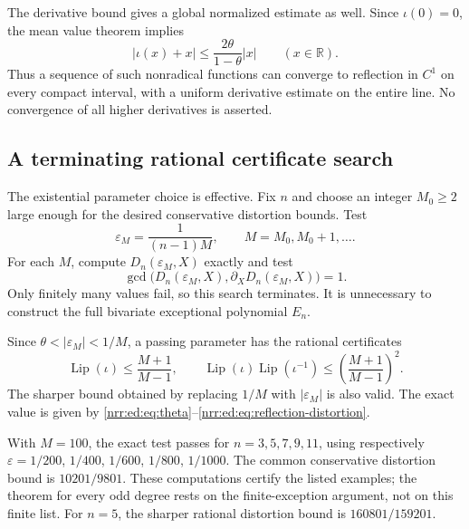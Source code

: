 \documentclass[11pt,letterpaper]{article}
\theoremstyle{definition}
\theoremstyle{remark}
\newcommand{\R}{\mathbb R}
\newcommand{\Lip}{\operatorname{Lip}}
\newcommand{\eps}{\varepsilon}
\begin{document}
The derivative bound gives a global normalized estimate as well. Since
$\iota(0)=0$, the mean value theorem implies
\begin{equation}
 |\iota(x)+x|\le
 \frac{2\theta}{1-\theta}|x|\qquad(x\in\R).
 \label{nrr:ed:eq:global-near-reflection}
\end{equation}
Thus a sequence of such nonradical functions can converge to reflection in
$C^1$ on every compact interval, with a uniform derivative estimate on the entire
line. No convergence of all higher derivatives is asserted.

\subsection{A terminating rational certificate search}

The existential parameter choice is effective. Fix $n$ and choose an integer
$M_0\ge2$ large enough for the desired conservative distortion bounds. Test
\begin{equation}
 \eps_M=\frac{1}{(n-1)M},\qquad M=M_0,M_0+1,\ldots.
 \label{nrr:ed:eq:epsilon-search}
\end{equation}
For each $M$, compute
$D_n(\eps_M,X)$ exactly and test
\begin{equation}
 \gcd\bigl(D_n(\eps_M,X),\partial_XD_n(\eps_M,X)\bigr)=1.
 \label{nrr:ed:eq:disc-gcd}
\end{equation}
Only finitely many values fail, so this search terminates. It is unnecessary to
construct the full bivariate exceptional polynomial $E_n$.

Since $\theta<|\eps_M|<1/M$, a passing parameter has the rational certificates
\begin{equation}
 \Lip(\iota)\le\frac{M+1}{M-1},\qquad
 \Lip(\iota)\Lip(\iota^{-1})\le\left(\frac{M+1}{M-1}\right)^2.
 \label{nrr:ed:eq:coarse-cert}
\end{equation}
The sharper bound obtained by replacing $1/M$ with $|\eps_M|$ is also valid.
The exact value is given by \eqref{nrr:ed:eq:theta}--\eqref{nrr:ed:eq:reflection-distortion}.

With $M=100$, the exact test passes for $n=3,5,7,9,11$, using respectively
$\eps=1/200$, $1/400$, $1/600$, $1/800$, $1/1000$. The common conservative distortion bound
is $10201/9801$. These computations certify the listed examples; the theorem for
every odd degree rests on the finite-exception argument, not on this finite list.
For $n=5$, the sharper rational distortion bound is $160801/159201$.
\end{document}
